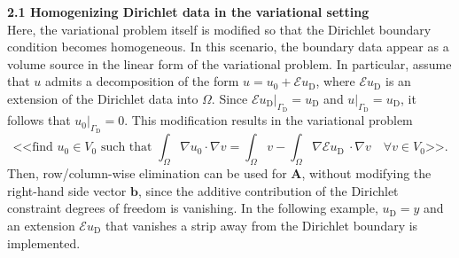 \documentclass[9pt]{amsart}
\theoremstyle{remark}
\theoremstyle{definition}
\begin{document}
\vspace*{0.2cm}
\textbf{2.1 Homogenizing Dirichlet data in the variational setting}\\
Here, the variational problem itself is modified so that the Dirichlet boundary condition becomes homogeneous. In this scenario, the boundary data appear as a volume source in the linear form of the variational problem. In particular, assume that $u$ admits a decomposition of the form $u=u_0+\mathcal{E}u_\mathrm{D}$, where $\mathcal{E}u_\mathrm{D}$ is an extension of the Dirichlet data into $\varOmega$. Since $\mathcal{E}u_\mathrm{D}|_{\varGamma_\mathrm{D}}=u_\mathrm{D}$ and $u|_{\Gamma_\mathrm{D}}=u_\mathrm{D}$, it follows that $u_0|_{\varGamma_\mathrm{D}}=0$. This modification results in the variational problem
\[
\text{<<find $u_0\in V_0$ such that }\int_{\varOmega}\nabla u_0 \cdot\nabla v = \int_{\varOmega} v - \int_{\varOmega}\nabla \mathcal{E}u_\mathrm{D}\ \cdot\nabla v\quad\forall v\in V_0\text{>>}.
\]
Then, row/column-wise elimination can be used for $\bm{A}$, without modifying the right-hand side vector $\bm{b}$, since the additive contribution of the Dirichlet constraint degrees of freedom is vanishing. In the following example, $u_\mathrm{D}=y$ and an extension $\mathcal{E}u_\mathrm{D}$ that vanishes a strip away from the Dirichlet boundary is implemented.
\end{document}

